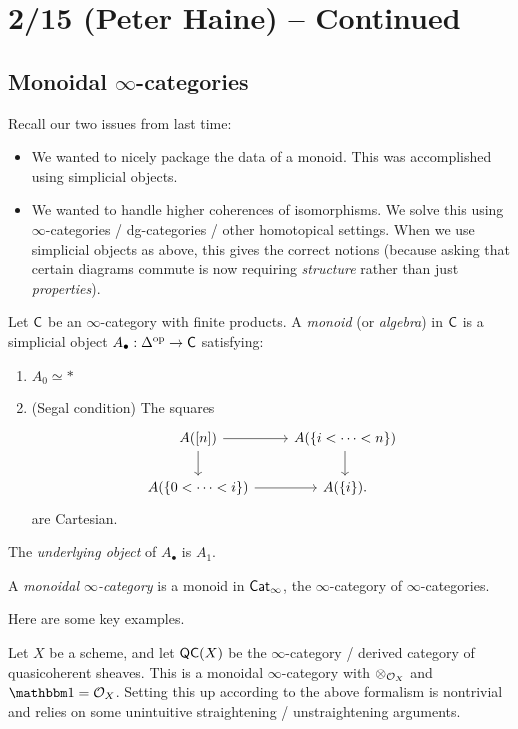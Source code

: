 \documentclass{article}
\begin{document}
\section{2/15 (Peter Haine) -- Continued}

\subsection{Monoidal $\infty$-categories}

Recall our two issues from last time:
\begin{itemize}
	\item We wanted to nicely package the data of a monoid.
		This was accomplished using simplicial objects.
	\item We wanted to handle higher coherences of isomorphisms.
		We solve this using $\infty$-categories / dg-categories / other homotopical settings.
		When we use simplicial objects as above, this gives the correct notions (because asking that certain diagrams commute is now requiring \emph{structure} rather than just \emph{properties}). 
\end{itemize}

\begin{dfn}
	Let $\mathsf{C}$ be an $\infty$-category with finite products.
	A \emph{monoid} (or \emph{algebra}) in $\mathsf{C}$ is a simplicial object $A_\bullet: \Delta^{\mathrm{op}} \to \mathsf{C}$ satisfying:
	\begin{enumerate}
		\item $A_0 \simeq *$
		\item (Segal condition) The squares
			\[
				\begin{tikzcd}
					A([n]) \rar \dar & A(\{i < \dots < n\}) \dar \\
					A(\{0 < \dots < i\}) \rar & A(\{i\}).
				\end{tikzcd}
			\]
			are Cartesian.
	\end{enumerate}
	The \emph{underlying object} of $A_\bullet$ is $A_1$.
\end{dfn}

\begin{dfn}
	A \emph{monoidal $\infty$-category} is a monoid in $\mathsf{Cat}_\infty$, the $\infty$-category of $\infty$-categories.
\end{dfn}

Here are some key examples.

\begin{ex}
	Let $X$ be a scheme, and let $\mathsf{QC}(X)$ be the $\infty$-category / derived category of quasicoherent sheaves.
	This is a monoidal $\infty$-category with $\otimes_{\mathcal{O}_X}$ and $\onebb = \Oc_X$.
	Setting this up according to the above formalism is nontrivial and relies on some unintuitive straightening / unstraightening arguments.
\end{ex}
\end{document}
